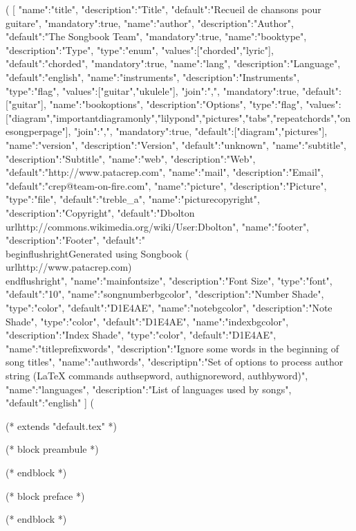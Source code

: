 %
%
%

(%
[
{"name":"title", "description":"Title", "default":"Recueil de chansons pour guitare", "mandatory":true},
{"name":"author", "description":"Author", "default":"The Songbook Team", "mandatory":true},
{"name":"booktype", "description":"Type", "type":"enum", "values":["chorded","lyric"], "default":"chorded", "mandatory":true},
{"name":"lang", "description":"Language", "default":"english"},
{"name":"instruments", "description":"Instruments", "type":"flag", "values":["guitar","ukulele"], "join":",", "mandatory":true, "default":["guitar"]},
{"name":"bookoptions", "description":"Options", "type":"flag", "values":["diagram","importantdiagramonly","lilypond","pictures","tabs","repeatchords","onesongperpage"], "join":",", "mandatory":true, "default":["diagram","pictures"]},
{"name":"version", "description":"Version", "default":"unknown"},
{"name":"subtitle", "description":"Subtitle"},
{"name":"web", "description":"Web", "default":"http://www.patacrep.com"},
{"name":"mail", "description":"Email", "default":"crep@team-on-fire.com"},
{"name":"picture", "description":"Picture", "type":"file", "default":"treble_a"},
{"name":"picturecopyright", "description":"Copyright", "default":"Dbolton \\url{http://commons.wikimedia.org/wiki/User:Dbolton}"},
{"name":"footer", "description":"Footer", "default":"\\begin{flushright}Generated using Songbook (\\url{http://www.patacrep.com})\\end{flushright}"},
{"name":"mainfontsize", "description":"Font Size", "type":"font", "default":"10"},
{"name":"songnumberbgcolor", "description":"Number Shade", "type":"color", "default":"D1E4AE"},
{"name":"notebgcolor", "description":"Note Shade", "type":"color", "default":"D1E4AE"},
{"name":"indexbgcolor", "description":"Index Shade", "type":"color", "default":"D1E4AE"},
{"name":"titleprefixwords", "description":"Ignore some words in the beginning of song titles"},
{"name":"authwords", "descriptipn":"Set of options to process author string (LaTeX commands authsepword, authignoreword, authbyword)"},
{"name":"languages", "description":"List of languages used by songs", "default":"english"}
]
(%

(* extends "default.tex" *)

(* block preambule *)
\usepackage{licence}
(* endblock *)

(* block preface *)
\newpage

\newpage
(* endblock *)
